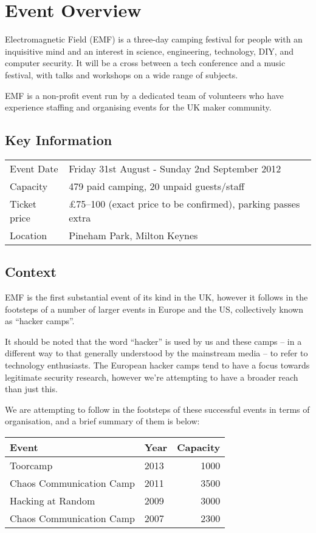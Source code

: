 \section{Event Overview}

Electromagnetic Field (EMF) is a three-day camping festival for people
with an inquisitive mind and an interest in science, engineering,
technology, DIY, and computer security. It will be a cross between a
tech conference and a music festival, with talks and workshops on a wide
range of subjects.

EMF is a non-profit event run by a dedicated team of volunteers who have
experience staffing and organising events for the UK maker community.

\subsection{Key Information}

\begin{tabular}{ l l }
Event Date & Friday 31st August - Sunday 2nd September 2012 \\
Capacity & 479 paid camping, 20 unpaid guests/staff \\
Ticket price & £75--100 (exact price to be confirmed), parking passes extra \\
Location & Pineham Park, Milton Keynes \\
\end{tabular}

\subsection{Context}

EMF is the first substantial event of its kind in the UK, however it
follows in the footsteps of a number of larger events in Europe and the
US, collectively known as ``hacker camps''.

It should be noted that the word ``hacker'' is used by us and these camps
-- in a different way to that generally understood by the
mainstream media -- to refer to technology enthusiasts. The European
hacker camps tend to have a focus towards legitimate security research,
however we're attempting to have a broader reach than just this.

We are attempting to follow in the footsteps of these successful events
in terms of organisation, and a brief summary of them is below:

\begin{tabular}{ l l r }
Event & Year & Capacity \\
\hline
Toorcamp & 2013 & 1000 \\
Chaos Communication Camp & 2011 & 3500 \\
Hacking at Random & 2009 & 3000 \\
Chaos Communication Camp & 2007 & 2300 \\
\end{tabular}

